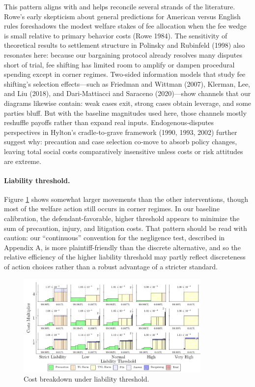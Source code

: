 \documentclass{article}
\begin{document}
This pattern aligns with and helps reconcile several strands of the literature. Rowe’s early skepticism about general predictions for American versus English rules foreshadows the modest welfare stakes of fee allocation when the fee wedge is small relative to primary behavior costs (Rowe 1984). The sensitivity of theoretical results to settlement structure in Polinsky and Rubinfeld (1998) also resonates here: because our bargaining protocol already resolves many disputes short of trial, fee shifting has limited room to amplify or dampen procedural spending except in corner regimes. Two‑sided information models that study fee shifting’s selection effects—such as Friedman and Wittman (2007), Klerman, Lee, and Liu (2018), and Dari‑Mattiacci and Saraceno (2020)—show channels that our diagrams likewise contain: weak cases exit, strong cases obtain leverage, and some parties bluff. But with the baseline magnitudes used here, those channels mostly reshuffle payoffs rather than expand real inputs. Endogenous‑disputes perspectives in Hylton’s cradle‑to‑grave framework (1990, 1993, 2002) further suggest why: precaution and case selection co‑move to absorb policy changes, leaving total social costs comparatively insensitive unless costs or risk attitudes are extreme.

\FloatBarrier
\paragraph{Liability threshold.}
Figure \ref{fig:liability_threshold} shows somewhat larger movements than the other interventions, though most of the welfare action still occurs in corner regimes. In our baseline calibration, the defendant-favorable, higher threshold appears to minimize the sum of precaution, injury, and litigation costs. That pattern should be read with caution: our “continuous” convention for the negligence test, described in Appendix A, is more plaintiff-friendly than the discrete alternative, and so the relative efficiency of the higher liability threshold may partly reflect discreteness of action choices rather than a robust advantage of a stricter standard.

\begin{figure}[ht]
  \centering
  \includegraphics[width=0.85\textwidth]{../Figures/Cost Breakdown Liability Threshold (All Rows).pdf}
  \caption{Cost breakdown under liability threshold.}
  \label{fig:liability_threshold}
\end{figure}
\end{document}
